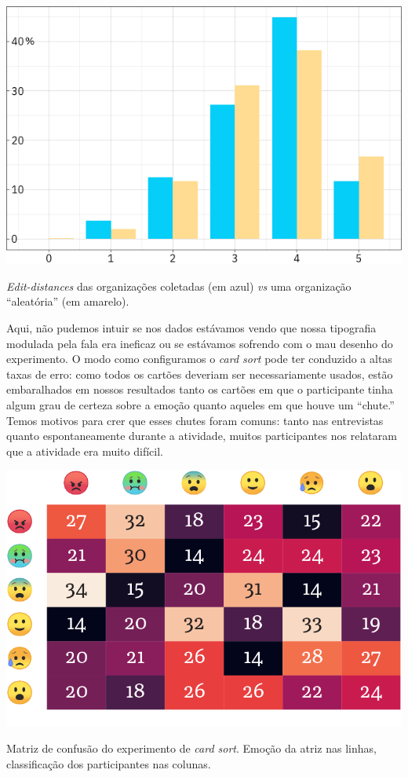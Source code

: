 \documentclass{tufte-handout}
\begin{document}
\begin{marginfigure}
  \includegraphics{imgs/edit_distance_reais.png}
  \caption{\textit{Edit-distances} das organizações coletadas (em azul) \textit{vs} uma organização ``aleatória'' (em amarelo).}
  \label{edit_dist_1}
\end{marginfigure}

Aqui, não pudemos intuir se nos dados estávamos vendo que nossa tipografia modulada pela fala era ineficaz ou se estávamos sofrendo com o mau desenho do experimento. O modo como configuramos o \textit{card sort} pode ter conduzido a altas taxas de erro: como todos os cartões deveriam ser necessariamente usados, estão embaralhados em nossos resultados tanto os cartões em que o participante tinha algum grau de certeza sobre a emoção quanto aqueles em que houve um ``chute.'' Temos motivos para crer que esses chutes foram comuns: tanto nas entrevistas quanto espontaneamente durante a atividade, muitos participantes nos relataram que a atividade era muito difícil.

\begin{marginfigure}[0.5\baselineskip]
  \includegraphics{imgs/confusion-emoji.png}
  \caption{Matriz de confusão do experimento de \textit{card sort}. Emoção da atriz nas linhas, classificação dos participantes nas colunas.}
  \label{matriz_confusao}
\end{marginfigure}
\end{document}
